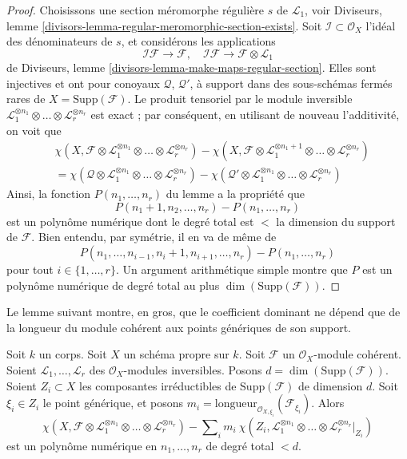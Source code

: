 \begin{proof}
\medskip\noindent
Choisissons une section méromorphe régulière $s$ de $\mathcal{L}_1$, voir
Diviseurs, lemme \ref{divisors-lemma-regular-meromorphic-section-exists}.
Soit $\mathcal{I} \subset \mathcal{O}_X$ l'idéal des
dénominateurs de $s$, et considérons les applications
$$
\mathcal{I}\mathcal{F} \to \mathcal{F},\quad
\mathcal{I}\mathcal{F} \to \mathcal{F} \otimes \mathcal{L}_1
$$
de Diviseurs, lemme \ref{divisors-lemma-make-maps-regular-section}.
Elles sont injectives et ont pour conoyaux $\mathcal{Q}$, $\mathcal{Q}'$,
à support dans des sous-schémas fermés rares de $X = \text{Supp}(\mathcal{F})$.
Le produit tensoriel par le module inversible
$\mathcal{L}_1^{\otimes n_1} \otimes \ldots \otimes \mathcal{L}_r^{\otimes n_r}$
est exact ; par conséquent, en utilisant de nouveau l'additivité,
on voit que
\begin{align*}
&\chi(X, \mathcal{F} \otimes \mathcal{L}_1^{\otimes n_1} \otimes \ldots \otimes
\mathcal{L}_r^{\otimes n_r}) -
\chi(X, \mathcal{F} \otimes \mathcal{L}_1^{\otimes n_1 + 1}
\otimes \ldots \otimes \mathcal{L}_r^{\otimes n_r}) \\
& =
\chi(\mathcal{Q} \otimes \mathcal{L}_1^{\otimes n_1} \otimes \ldots \otimes
\mathcal{L}_r^{\otimes n_r}) -
\chi(\mathcal{Q}' \otimes \mathcal{L}_1^{\otimes n_1} \otimes \ldots \otimes
\mathcal{L}_r^{\otimes n_r})
\end{align*}
Ainsi, la fonction $P(n_1, \ldots, n_r)$ du lemme
a la propriété que
$$
P(n_1 + 1, n_2, \ldots, n_r) - P(n_1, \ldots, n_r)
$$
est un polynôme numérique dont le degré total est $<$ la dimension
du support de $\mathcal{F}$. Bien entendu, par symétrie, il en va
de même de
$$
P(n_1, \ldots, n_{i - 1}, n_i + 1, n_{i + 1}, \ldots, n_r)
- P(n_1, \ldots, n_r)
$$
pour tout $i \in \{1, \ldots, r\}$. Un argument arithmétique simple montre
que $P$ est un polynôme numérique de degré total au plus
$\dim(\text{Supp}(\mathcal{F}))$.
\end{proof}

\noindent
Le lemme suivant montre, en gros, que le coefficient dominant ne dépend que
de la longueur du module cohérent aux points génériques de son
support.

\begin{lemma}
\label{lemma-numerical-polynomial-leading-term}
Soit $k$ un corps. Soit $X$ un schéma propre sur $k$. Soit
$\mathcal{F}$ un $\mathcal{O}_X$-module cohérent. Soient
$\mathcal{L}_1, \ldots, \mathcal{L}_r$ des $\mathcal{O}_X$-modules inversibles.
Posons $d = \dim(\text{Supp}(\mathcal{F}))$.
Soient $Z_i \subset X$ les composantes irréductibles
de $\text{Supp}(\mathcal{F})$ de dimension $d$. Soit $\xi_i \in Z_i$
le point générique, et posons
$m_i = \text{longueur}_{\mathcal{O}_{X, \xi_i}}(\mathcal{F}_{\xi_i})$.
Alors
$$
\chi(X, \mathcal{F} \otimes \mathcal{L}_1^{\otimes n_1} \otimes \ldots \otimes
\mathcal{L}_r^{\otimes n_r}) -
\sum\nolimits_i
m_i\ \chi(Z_i, \mathcal{L}_1^{\otimes n_1} \otimes \ldots \otimes
\mathcal{L}_r^{\otimes n_r}|_{Z_i})
$$
est un polynôme numérique en $n_1, \ldots, n_r$ de degré total $< d$.
\end{lemma}


